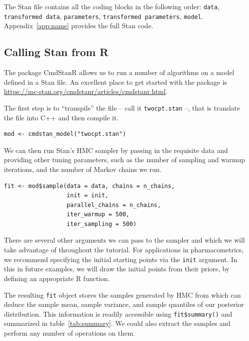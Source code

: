 The Stan file contains all the coding blocks in the following order: \texttt{data}, \texttt{transformed data}, \texttt{parameters}, \texttt{transformed parameters}, \texttt{model}.
Appendix~\ref{app:name} provides the full Stan code.

\subsection{Calling Stan from R}

The package CmdStanR allows us to run a number of algorithms on a model defined in a Stan file.
An excellent place to get started with the package is \url{https://mc-stan.org/cmdstanr/articles/cmdstanr.html}.

The first step is to ``transpile'' the file -- call it \texttt{twocpt.stan} --, that is translate the file into C++ and then compile it.
\begin{lstlisting}
mod <- cmdstan_model("twocpt.stan")
\end{lstlisting}
%
We can then run Stan's HMC sampler by passing in the requisite data and providing other tuning parameters,
such as the number of sampling and warmup iterations, and the number of Markov chains we run.
\begin{lstlisting}
fit <- mod$sample(data = data, chains = n_chains,
                  init = init,
                  parallel_chains = n_chains,
                  iter_warmup = 500, 
                  iter_sampling = 500)
\end{lstlisting}
%
There are several other arguments we can pass to the sampler and which we will take advantage of throughout the tutorial.
For applications in pharmacometrics, we recommend specifying the initial starting points via the \texttt{init} argument.
In this in future examples, we will draw the initial points from their priors, by defining an appropriate R function.

The resulting \texttt{fit} object stores the samples generated by HMC from which can deduce the sample mean, sample variance, and sample quantiles of our posterior distribution.
This information is readily accessible using \texttt{fit\$summary()} and summarized in table~\ref{tab:summary}.
We could also extract the samples and perform any number of operations on them.

